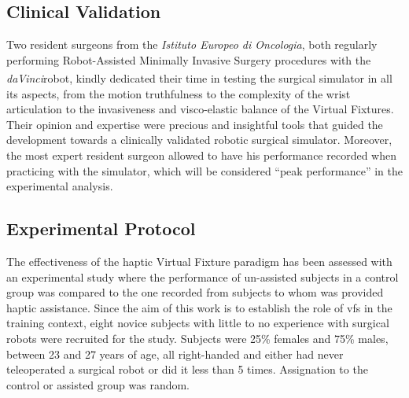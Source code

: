 \documentclass{article}
\newcommand{\cright}{\textsuperscript{\textregistered}\phantom{..}}
\begin{document}
\begin{multicols}{2}
\subsection{Clinical Validation}
Two resident surgeons from the \textit{Istituto Europeo di Oncologia}, both regularly performing Robot-Assisted Minimally Invasive Surgery procedures with the \textit{daVinci}\cright robot, kindly dedicated their time in testing the surgical simulator in all its aspects, from the motion truthfulness to the complexity of the wrist articulation to the invasiveness and visco-elastic balance of the Virtual Fixtures. Their opinion and expertise were precious and insightful tools that guided the development towards a clinically validated robotic surgical simulator. 
Moreover, the most expert resident surgeon allowed to have his performance recorded when practicing with the simulator, which will be considered ``peak performance'' in the experimental analysis. 
\subsection{Experimental Protocol}
The effectiveness of the haptic Virtual Fixture paradigm has been assessed with an experimental study where the performance of un-assisted subjects in a control group was compared to the one recorded from subjects to whom was provided haptic assistance. Since the aim of this work is to establish the role of \acp{vf} in the training context, eight novice subjects with little to no experience with surgical robots were recruited for the study. Subjects were 25\% females and 75\% males, between 23 and 27 years of age, all right-handed and either had never teleoperated a surgical robot or did it less than 5 times. Assignation to the control or assisted group was random.


\end{multicols}
\end{document}
